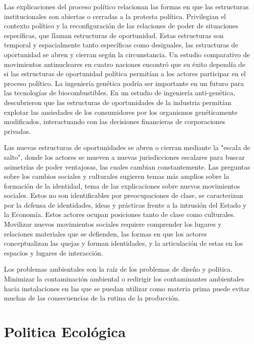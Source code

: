 \documentclass{article}
\begin{document}
Las explicaciones del proceso político relacionan las formas en que las estructuras institucionales son abiertas o cerradas a la protesta política. Privilegian el contexto político y la reconfiguración de las relaciones de poder de situaciones específicas, que llaman estructuras de oportunidad. Estas estructuras son temporal y espacialmente tanto específicas como desiguales, las estructuras de oportunidad se abren y cierran según la circunstancia. Un estudio comparativo de movimientos antinucleares en cuatro naciones encontró que su éxito dependía de si las estructuras de oportunidad política permitían a los actores participar en el proceso político. La ingeniería genética podría ser importante en un futuro para las tecnologías de biocombustibles. En un estudio de ingeniería anti-genética, descubrieron que las estructuras de oportunidades de la industria permitían explotar las ansiedades de los consumidores por los organismos genéticamente modificados, interactuando con las decisiones financieras de corporaciones privadas.


Las nuevas estructuras de oportunidades se abren o cierran mediante la "escala de salto", donde los actores se mueven a nuevas jurisdicciones escalares para buscar asimetrías de poder ventajosas, las cuales cambian constantemente. Las preguntas sobre los cambios sociales y culturales sugieren temas más amplios sobre la formación de la identidad, tema de las explicaciones sobre nuevos movimientos sociales. Estos no son identificables por preocupaciones de clase, se caracterizan por la defensa de identidades, ideas y prácticas frente a la intrusión del Estado y la Economía. Estos actores ocupan posiciones tanto de clase como culturales. Movilizar nuevos movimientos sociales requiere comprender los lugares y relaciones materiales que se defienden, las formas en que los actores conceptualizan las quejas y forman identidades, y la articulación de estas en los espacios y lugares de interacción.


Los problemas ambientales son la raíz de los problemas de diseño y política. Minimizar la contaminación ambiental o redirigir los contaminantes ambientales hacia instalaciones en las que se puedan utilizar como materia prima puede evitar muchas de las consecuencias de la rutina de la producción. 


\section{Politica Ecológica}
\end{document}
